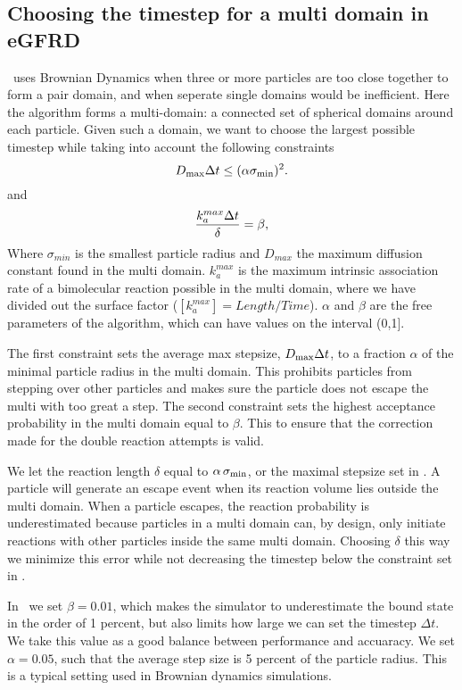 \subsection{Choosing the timestep for a multi domain in eGFRD}

\GFRD\, uses Brownian Dynamics when three or more particles are too close together to form a pair domain, and when seperate single domains would be inefficient. Here the algorithm forms a multi-domain: a connected set of spherical domains around each particle. Given such a domain, we want to choose the largest possible timestep while taking into account the following constraints
\begin{equation}
 D_{\rm max} \Delta t \leq (\alpha \sigma_{\rm min})^2.
 \elabel{BDcntrI}
\end{equation}
and
\begin{equation}
 \frac{k_{a}^{max} \Delta t}{\delta} = \beta,
 \elabel{BDcntrII}
\end{equation}
Where $\sigma_{min}$ is the smallest particle radius and $D_{max}$ the maximum diffusion constant found in the multi domain. $k_{a}^{max}$ is the maximum intrinsic association rate of a bimolecular reaction possible in the multi domain, where we have divided out the surface factor ($[k_{a}^{max}] = Length/Time $). $\alpha$ and $\beta$ are the free parameters of the algorithm, which can have values on the interval (0,1].

The first constraint sets the average max stepsize, $D_{\rm max} \Delta t$, to a fraction $\alpha$ of the minimal particle radius in the multi domain. This prohibits particles from stepping over other particles and makes sure the particle does not escape the multi with too great a step. The second constraint sets the highest acceptance probability in the multi domain equal to $\beta$. This to ensure that the correction made for the double reaction attempts is valid. 

We let the reaction length $\delta$ equal to $\alpha \, \sigma_{\rm min}$, or the maximal stepsize set in . A particle will generate an escape event when its reaction volume lies outside the multi domain. When a particle escapes, the reaction probability is underestimated because particles in a multi domain can, by design, only initiate reactions with other particles inside the same multi domain. Choosing $\delta$ this way we minimize this error while not decreasing the timestep below the constraint set in .

In \GFRD\, we set $\beta = 0.01$, which makes the simulator to underestimate the bound state in the order of 1 percent, but also limits how large we can set the timestep $\Delta t$. We take this value as a good balance between performance and accuaracy. We set $\alpha = 0.05$, such that the average step size is 5 percent of the particle radius. This is a typical setting used in Brownian dynamics simulations.


